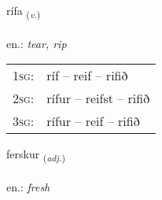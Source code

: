 \documentclass[frontgrid, backgrid]{flacards}\usepackage[]{graphicx}\usepackage[]{xcolor}
\begin{document}
\renewcommand{\blhead}{\vskip5pt {\small\bfseries\footnotesize Sagnorð | Verb }}
\renewcommand{\bcfoot}{\vskip5pt \hspace{2pt}{\small\bfseries\footnotesize 2K}}


{rífa \small{\textsubscript{(\textit{v.})}} \\[1ex] %
\textphonetic{[riːva]} \\
en.: \emph{tear, rip} \\  [2ex]
\renewcommand*{\arraystretch}{0.8}
\begin{tabular}{p{1cm}l}
\textsc{1sg}: & ríf -- reif -- rifið \\ 
\textsc{2sg}: & rífur -- reifst -- rifið \\ 
\textsc{3sg}: & rífur -- reif -- rifið \\ 
\end{tabular}
}

\renewcommand{\flhead}{\vskip5pt \fboxsep=0pt {\small\bfseries\footnotesize Lýsingarorð | Adjective}}
\renewcommand{\fcfoot}{\vskip5pt \fboxsep=0pt \hspace{2pt}{\small\bfseries\footnotesize 2K}}

\renewcommand{\blhead}{\vskip5pt {\small\bfseries\footnotesize Lýsingarorð | Adjective }}
\renewcommand{\bcfoot}{\vskip5pt \hspace{2pt}{\small\bfseries\footnotesize 2K}}


{ferskur \small{\textsubscript{(\textit{adj.})}} \\[1ex] %
 \\
en.: \emph{fresh} \\  [2ex]
\renewcommand*{\arraystretch}{0.8}
}
\end{document}
